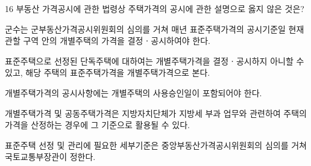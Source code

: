 \begin{question}{16}
부동산 가격공시에 관한 법령상 주택가격의 공시에 관한 설명으로 옳지 않은 것은?
\begin{choices}
  \item 군수는 군부동산가격공시위원회의 심의를 거쳐 매년 표준주택가격의 공시기준일 현재 관할 구역 안의 개별주택의 가격을 결정ㆍ공시하여야 한다.
  \item 표준주택으로 선정된 단독주택에 대하여는 개별주택가격을 결정ㆍ공시하지 아니할 수 있고, 해당 주택의 표준주택가격을 개별주택가격으로 본다.
  \item 개별주택가격의 공시사항에는 개별주택의 사용승인일이 포함되어야 한다.
  \item 개별주택가격 및 공동주택가격은 지방자치단체가 지방세 부과 업무와 관련하여 주택의 가격을 산정하는 경우에 그 기준으로 활용될 수 있다.
  \item 표준주택 선정 및 관리에 필요한 세부기준은 중앙부동산가격공시위원회의 심의를 거쳐 국토교통부장관이 정한다.
\end{choices}
\end{question}
